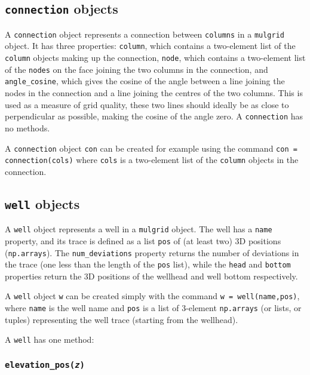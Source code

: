 \subsection{\texttt{connection} objects}
\label{connections}

A \texttt{connection} object represents a connection between \texttt{columns} in a \texttt{mulgrid} object.  It has three properties: \texttt{column}, which contains a two-element list of the \texttt{column} objects making up the connection, \texttt{node}, which contains a two-element list of the \texttt{nodes} on the face joining the two columns in the connection, and \texttt{angle\_cosine}, which gives the cosine of the angle between a line joining the nodes in the connection and a line joining the centres of the two columns.  This is used as a measure of grid quality, these two lines should ideally be as close to perpendicular as possible, making the cosine of the angle zero.  A \texttt{connection} has no methods.

A \texttt{connection} object \texttt{con} can be created for example using the command \texttt{con = connection(cols)} where \texttt{cols} is a two-element list of the \texttt{column} objects in the connection.

\subsection{\texttt{well} objects}

A \texttt{well} object represents a well in a \texttt{mulgrid} object.  The well has a \texttt{name} property, and its trace is defined as a list \texttt{pos} of (at least two) 3D positions (\texttt{np.arrays}).  The \texttt{num\_deviations} property returns the number of deviations in the trace (one less than the length of the \texttt{pos} list), while the \texttt{head} and \texttt{bottom} properties return the 3D positions of the wellhead and well bottom respectively.

A \texttt{well} object \texttt{w} can be created simply with the command \texttt{w = well(name,pos)}, where \texttt{name} is the well name and \texttt{pos} is a list of 3-element \texttt{np.arrays} (or lists, or tuples) representing the well trace (starting from the wellhead).

A \texttt{well} has one method:

\subsubsection{\texttt{elevation\_pos(\emph{z})}}

